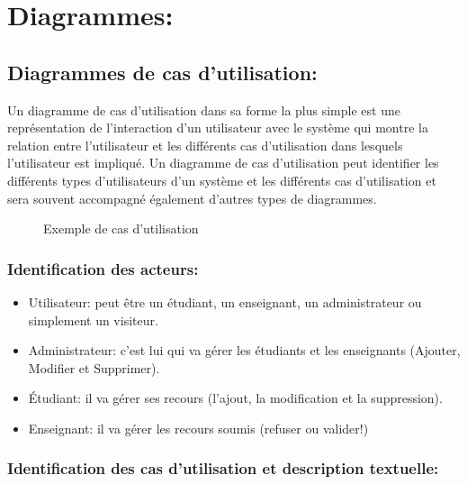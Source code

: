 \documentclass[12pt]{report}
\begin{document}
\vspace{-0.2in}
\section{Diagrammes:}

\subsection{Diagrammes de cas d'utilisation:}

Un diagramme de cas d'utilisation dans sa forme la plus simple est une représentation de l'interaction d'un utilisateur avec le système qui montre la relation entre l'utilisateur et les différents cas d'utilisation dans lesquels l'utilisateur est impliqué. Un diagramme de cas d'utilisation peut identifier les différents types d'utilisateurs d'un système et les différents cas d'utilisation et sera souvent accompagné également d'autres types de diagrammes.

\begin{figure}[h]
\centering
    \caption{Exemple de cas d'utilisation}
\end{figure}

\subsubsection{Identification des acteurs:}
\begin{itemize}
\item Utilisateur: peut être un étudiant, un enseignant, un administrateur ou simplement un visiteur.
\item Administrateur: c'est lui qui va gérer les étudiants et les enseignants (Ajouter, Modifier et Supprimer).
\item Étudiant: il va gérer ses recours (l'ajout, la modification et la suppression).
\item Enseignant: il va gérer les recours soumis (refuser ou valider!)
\end{itemize}

\subsubsection{Identification des cas d'utilisation et description textuelle:}
\end{document}
